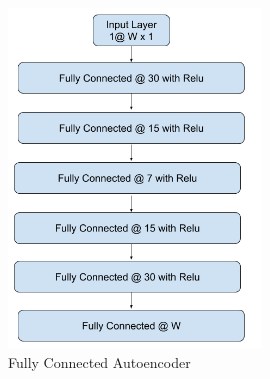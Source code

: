 \documentclass[12pt]{article}
\begin{document}
\begin{figure}[H]
\centering
        \includegraphics[width=0.6\textwidth]{images/architecture/NnAutoencoder.png}
    \caption{Fully Connected Autoencoder}
    \label{nnAutoencoder}
\end{figure}
\end{document}
